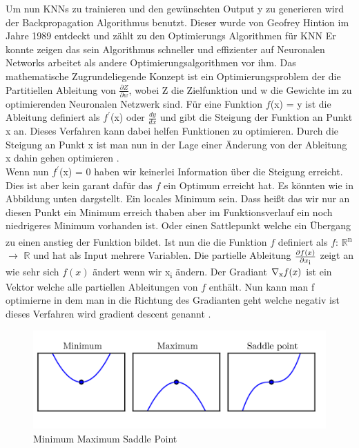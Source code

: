 \documentclass{llncs}
\begin{document}
Um nun KNNs zu trainieren und den gewünschten Output y zu generieren wird der Backpropagation Algorithmus benutzt. Dieser wurde von Geofrey Hintion im Jahre 1989 entdeckt\cite{backpro} und zählt zu den Optimierungs Algorithmen für KNN Er konnte zeigen das sein Algorithmus schneller und effizienter auf Neuronalen Networks arbeitet als andere Optimierungsalgorithmen vor ihm. Das mathematische Zugrundeliegende Konzept ist ein Optimierungsproblem der die Partitiellen Ableitung von  $\frac{\partial Z}{\partial w}$, wobei Z die Zielfunktion und w die Gewichte im zu optimierenden Neuronalen Netzwerk sind. Für eine Funktion $f$(x) = y ist die Ableitung definiert als $f^\prime$(x) oder $\frac{dy}{dx}$ und gibt die Steigung der Funktion an Punkt x an. Dieses Verfahren kann dabei helfen Funktionen zu optimieren. Durch die Steigung an Punkt x ist man nun in der Lage einer Änderung von der Ableitung x dahin gehen optimieren \cite{Grundlagen}. \\

Wenn nun $f^\prime$(x) = 0 haben wir keinerlei Information über die Steigung erreicht. Dies ist aber kein garant dafür das $f$ ein Optimum erreicht hat.  Es könnten wie in Abbildung unten dargstellt. Ein locales Minimum sein. Dass heißt das wir nur an diesen Punkt ein Minimum erreich thaben aber im Funktionsverlauf ein noch niedrigeres Minimum vorhanden ist. Oder einen Sattlepunkt welche ein Übergang zu einen anstieg der Funktion bildet.
Ist nun die die Funktion $f$ definiert als $f$: $\mathbb{R}$\textsuperscript{n} $\rightarrow$  $\mathbb{R}$ und hat als Input mehrere Variablen. Die partielle Ableitung $\frac{\partial f(x)}{\partial x\textsubscript{i}}$ zeigt an wie sehr sich $f(x)$ ändert wenn wir x\textsubscript{i} ändern. Der Gradiant $\nabla\textsubscript{x}f(x)$ ist ein Vektor welche alle partiellen Ableitungen von $f$ enthält. Nun kann man f optimierne in dem man in die Richtung des Gradianten geht welche negativ ist dieses Verfahren wird gradient descent genannt \cite{Grundlagen}.
\begin{figure}[htbp] 
	\centering
	\includegraphics[width=1.0\textwidth]{saddle.png}
	\caption{Minimum Maximum Saddle Point}
	\label{fig:Bild5}
\end{figure}
\end{document}

